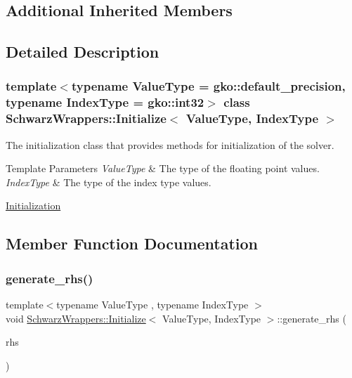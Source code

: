 \subsection*{Additional Inherited Members}


\subsection{Detailed Description}
\subsubsection*{template$<$typename Value\+Type = gko\+::default\+\_\+precision, typename Index\+Type = gko\+::int32$>$\newline
class Schwarz\+Wrappers\+::\+Initialize$<$ Value\+Type, Index\+Type $>$}

The initialization class that provides methods for initialization of the solver. 


\begin{DoxyTemplParams}{Template Parameters}
{\em Value\+Type} & The type of the floating point values. \\
\hline
{\em Index\+Type} & The type of the index type values.\\
\hline
\end{DoxyTemplParams}
\hyperlink{group__init}{Initialization} 

\subsection{Member Function Documentation}
\mbox{\label{classSchwarzWrappers_1_1Initialize_a96fdb68e6a32c55e411b9a9e11a276f9}} 
\subsubsection{\texorpdfstring{generate\+\_\+rhs()}{generate\_rhs()}}
{\footnotesize\ttfamily template$<$typename Value\+Type , typename Index\+Type $>$ \\
void \hyperlink{classSchwarzWrappers_1_1Initialize}{Schwarz\+Wrappers\+::\+Initialize}$<$ Value\+Type, Index\+Type $>$\+::generate\+\_\+rhs (\begin{DoxyParamCaption}\item[{std\+::vector$<$ Value\+Type $>$ \&}]{rhs }\end{DoxyParamCaption})}



